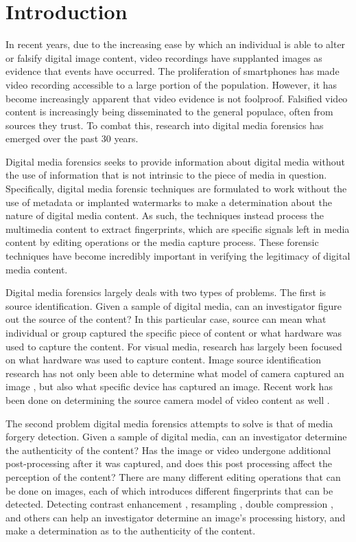 \chapter{Introduction}

In recent years, due to the increasing ease by which an individual is able to alter or falsify digital image content, video recordings have supplanted images as evidence that events have occurred. The proliferation of smartphones has made video recording accessible to a large portion of the population. However, it has become increasingly apparent that video evidence is not foolproof. Falsified video content is increasingly being disseminated to the general populace, often from sources they trust. To combat this, research into digital media forensics has emerged over the past 30 years.

Digital media forensics seeks to provide information about digital media without the use of information that is not intrinsic to the piece of media in question. Specifically, digital media forensic techniques are formulated to work without the use of metadata or implanted watermarks to make a determination about the nature of digital media content. As such, the techniques instead process the multimedia content to extract fingerprints, which are specific signals left in media content by editing operations or the media capture process. These forensic techniques have become incredibly important in verifying the legitimacy of digital media content.

Digital media forensics largely deals with two types of problems. The first is source identification. Given a sample of digital media, can an investigator figure out the source of the content? In this particular case, source can mean what individual or group captured the specific piece of content or what hardware was used to capture the content. For visual media, research has largely been focused on what hardware was used to capture content. Image source identification research has not only been able to determine what model of camera captured an image \cite{imagesourceid}, but also what specific device \cite{prnu} has captured an image. Recent work has been done on determining the source camera model of video content as well \cite{videosourceid}.

The second problem digital media forensics attempts to solve is that of media forgery detection. Given a sample of digital media, can an investigator determine the authenticity of the content? Has the image or video undergone additional post-processing after it was captured, and does this post processing affect the perception of the content? There are many different editing operations that can be done on images, each of which introduces different fingerprints that can be detected. Detecting contrast enhancement \cite{contrastenhance}, resampling \cite{resampling}, double compression \cite{doubleJPEG}, and others \cite{lca} can help an investigator determine an image's processing history, and make a determination as to the authenticity of the content.

